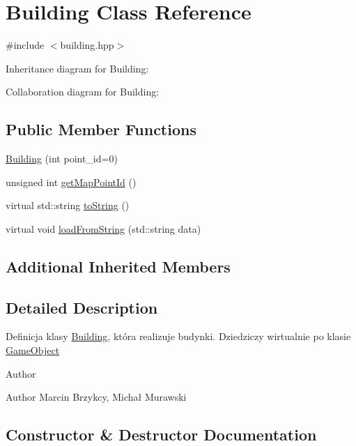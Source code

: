 \hypertarget{classBuilding}{}\section{Building Class Reference}
\label{classBuilding}


{\ttfamily \#include $<$building.\+hpp$>$}



Inheritance diagram for Building\+:


Collaboration diagram for Building\+:
\subsection*{Public Member Functions}
\begin{DoxyCompactItemize}
\item 
\hyperlink{classBuilding_a9c20f938b7d39c4b1020e0654dc8739f}{Building} (int point\+\_\+id=0)
\item 
unsigned int \hyperlink{classBuilding_ad103cb8318a9994183bfa5468cf39f11}{get\+Map\+Point\+Id} ()
\item 
virtual std\+::string \hyperlink{classBuilding_a00cdb72dff7401ef0e91d989202b6153}{to\+String} ()
\item 
virtual void \hyperlink{classBuilding_a6d0f64a5fda38ab9b0011b3291b852b7}{load\+From\+String} (std\+::string data)
\end{DoxyCompactItemize}
\subsection*{Additional Inherited Members}


\subsection{Detailed Description}
Definicja klasy \hyperlink{classBuilding}{Building}, która realizuje budynki. Dziedziczy wirtualnie po klasie \hyperlink{classGameObject}{Game\+Object} \begin{DoxyAuthor}{Author}

\end{DoxyAuthor}
\begin{DoxyParagraph}{Author}
Marcin Brzykcy, Michał Murawski 
\end{DoxyParagraph}


\subsection{Constructor \& Destructor Documentation}
